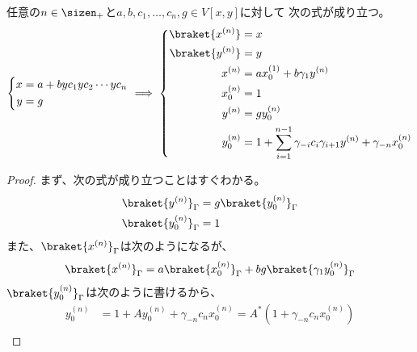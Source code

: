 {	\begin{proposition}[文法の線形化その二]\label{prop:文法の線形化その二} %
		任意の$n\in\sizen_+$と$a,b,c_1,\dots,c_n,g\in V[x,y]$に対して
		次の式が成り立つ。
		\begin{equation*}\begin{split}
			\left\{\begin{split}
				x &= a + byc_1yc_2\cdots yc_n \\
				y &= g \\
			\end{split}\right. \implies \left\{\begin{split}
				\braket{x^{(n)}} &= x \\
				\braket{y^{(n)}} &= y \\
				x^{(n)} &= ax_0^{(1)} + b\gamma_1y^{(n)} \\
				x_0^{(n)} &= 1 \\
				y^{(n)} &= gy_0^{(n)} \\
				y_0^{(n)} &= 1 + \sum_{i=1}^{n-1}\gamma_{-i}c_i\gamma_{i+1}y^{(n)}
					+ \gamma_{-n}x_0^{(n)} \\
			\end{split}\right.
		\end{split}\end{equation*}
	\end{proposition} %
	\begin{proof} %
		まず、次の式が成り立つことはすぐわかる。
		\begin{equation*}\begin{split}
			\braket{y^{(n)}}_\Gamma &= g\braket{y_0^{(n)}}_\Gamma \\
			\braket{y_0^{(n)}}_\Gamma &= 1 \\
		\end{split}\end{equation*}
		また、$\braket{x^{(n)}}_\Gamma$は次のようになるが、
		\begin{equation*}\begin{split}
			\braket{x^{(n)}}_\Gamma &= a\braket{x_0^{(n)}}_\Gamma
				+ bg\braket{\gamma_1y_0^{(n)}}_\Gamma \\
		\end{split}\end{equation*}
		$\braket{y_0^{(n)}}_\Gamma$は次のように書けるから、
		\begin{equation*}\begin{split}
			y_0^{(n)} &= 1 + Ay_0^{(n)} + \gamma_{-n}c_nx_0^{(n)}
			= A^*(1 + \gamma_{-n}c_nx_0^{(n)}) \\

\end{split}
\end{equation*}
\end{proof}}
